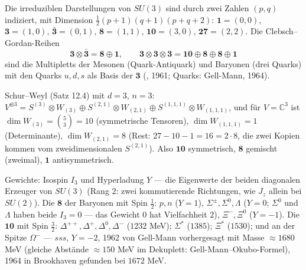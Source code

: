 \begin{merksatz}
Die irreduziblen Darstellungen von $SU(3)$ sind durch zwei Zahlen $(p, q)$ indiziert, mit Dimension $\frac12(p + 1)(q + 1)(p + q + 2)$: $\mathbf 1 = (0, 0)$, $\mathbf 3 = (1, 0)$, $\bar{\mathbf 3} = (0, 1)$, $\mathbf 8 = (1, 1)$, $\mathbf{10} = (3, 0)$, $\mathbf{27} = (2, 2)$. Die Clebsch--Gordan-Reihen
\[ \mathbf 3\otimes\bar{\mathbf 3} = \mathbf 8\oplus\mathbf 1,\qquad\mathbf 3\otimes\mathbf 3\otimes\mathbf 3 = \mathbf{10}\oplus\mathbf 8\oplus\mathbf 8\oplus\mathbf 1 \]
sind die Multipletts der Mesonen (Quark-Antiquark) und Baryonen (drei Quarks) mit den Quarks $u, d, s$ als Basis der $\mathbf 3$ (,  1961; Quarks: Gell-Mann,  1964).

Schur--Weyl (Satz 12.4) mit $d = 3$, $n = 3$: $V^{\otimes3} = S^{(3)}\otimes W_{(3)}\oplus S^{(2,1)}\otimes W_{(2,1)}\oplus S^{(1,1,1)}\otimes W_{(1,1,1)}$, und für $V = \mathbb C^{3}$ ist $\dim W_{(3)} = \binom{5}{3} = 10$ (symmetrische Tensoren), $\dim W_{(1,1,1)} = 1$ (Determinante), $\dim W_{(2,1)} = 8$ (Rest: $27 - 10 - 1 = 16 = 2\cdot8$, die zwei Kopien kommen vom zweidimensionalen $S^{(2,1)}$). Also $\mathbf{10}$ symmetrisch, $\mathbf 8$ gemischt (zweimal), $\mathbf 1$ antisymmetrisch.

Gewichte: Isospin $I_3$ und Hyperladung $Y$ --- die Eigenwerte der beiden diagonalen Erzeuger von $SU(3)$ (Rang $2$: zwei kommutierende Richtungen, wie $J_z$ allein bei $SU(2)$). Die $\mathbf 8$ der Baryonen mit Spin $\frac12$: $p, n$ ($Y = 1$), $\Sigma^{\pm}, \Sigma^{0}, \Lambda$ ($Y = 0$; $\Sigma^{0}$ und $\Lambda$ haben beide $I_3 = 0$ --- das Gewicht $0$ hat Vielfachheit $2$), $\Xi^{-}, \Xi^{0}$ ($Y = -1$). Die $\mathbf{10}$ mit Spin $\frac32$: $\Delta^{++}, \Delta^{+}, \Delta^{0}, \Delta^{-}$ ($1232$ MeV); $\Sigma^{*}$ ($1385$); $\Xi^{*}$ ($1530$); und an der Spitze $\Omega^{-}$ --- $sss$, $Y = -2$, 1962 von Gell-Mann vorhergesagt mit Masse $\approx1680$ MeV (gleiche Abstände $\approx150$ MeV im Dekuplett: Gell-Mann--Okubo-Formel), 1964 in Brookhaven gefunden bei $1672$ MeV.

\begin{center}
\end{center}


\end{merksatz}
